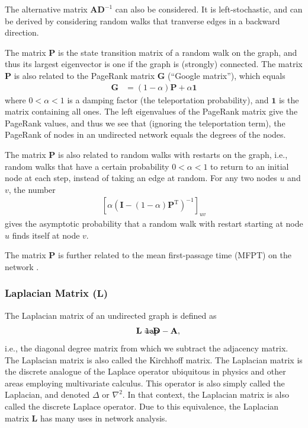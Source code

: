 \documentclass{article}
\def\mathnote#1{%
  \tag*{\rlap{\hspace\marginparsep\smash{\parbox[t]{\marginparwidth}{#1}}}}
}
\begin{document}
The alternative matrix $\mathbf A \mathbf D^{-1}$ can also be
considered.  It is left-stochastic, and
can be derived by considering random walks that tranverse edges in a
backward direction. 

The matrix $\mathbf P$ is the state transition matrix of a random walk
on the graph, and thus its largest eigenvector is one if the graph is
(strongly) connected.  
The matrix $\mathbf P$ is also related to the PageRank matrix $\mathbf
G$ (``Google matrix''), which
equals 
\begin{align}
  \mathbf G &= (1-\alpha) \mathbf P + \alpha\mathbf 1
\end{align}
where $0 < \alpha < 1$ is a damping factor (the teleportation
probability), and $\mathbf 1$ is the matrix containing all ones.  The
left 
eigenvalues of the PageRank matrix give the PageRank values, and thus
we see that (ignoring the teleportation term), the PageRank of nodes in
an undirected network equals the degrees of the nodes. 

The matrix $\mathbf P$ is also related to random walks with restarts on
the graph, i.e., random walks that have a certain probability $0 <
\alpha < 1$
to return to an initial node at each step, instead of taking an edge at
random.  For any two nodes $u$ and $v$, the number
\begin{align}
  \left[\alpha  (\mathbf I - (1-\alpha) \mathbf P^{\mathrm T})^{-1}\right]_{uv}
\end{align}
gives the asymptotic probability that a random walk with restart starting at node $u$
finds itself at node $v$.  

The matrix $\mathbf P$ is further related to the mean first-passage time
(MFPT) on the network \citep{b880}.

\subsubsection{Laplacian Matrix ($\mathbf L$)}
\label{sec:matrix.L}
The Laplacian matrix of an undirected graph is defined as
\begin{align}
  \mathnote{\texttt{lap}}
  \mathbf L &= \mathbf D - \mathbf A,
\end{align}
i.e., the diagonal degree matrix from which we subtract the adjacency
matrix.  The Laplacian matrix is also called the Kirchhoff matrix. 
The Laplacian matrix is the discrete analogue of the Laplace operator
ubiquitous in physics and other areas employing multivariate calculus.
This operator is also simply called the Laplacian, and denoted $\Delta$ or
$\nabla^2$.  In that context, the Laplacian matrix is also called the
discrete Laplace operator. 
Due to this equivalence, the Laplacian matrix $\mathbf L$
has many uses in network analysis. 
\end{document}
